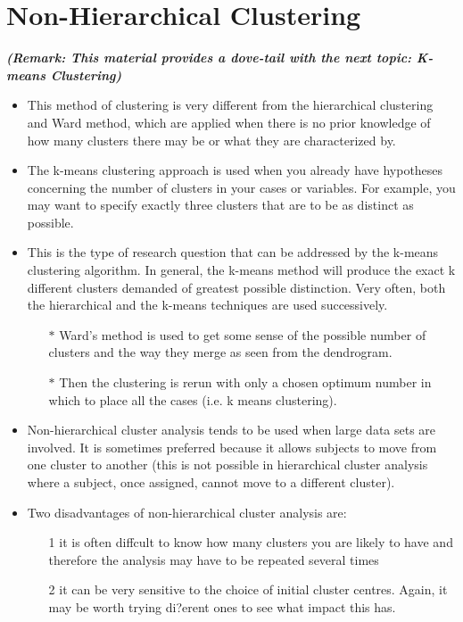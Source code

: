 \section{Non-Hierarchical Clustering}
\noindent \textbf{\textit{(Remark: This material provides a dove-tail with the next topic: K-means Clustering)}}\\ \smallskip
\begin{itemize}
\item This method of clustering is very different from the hierarchical clustering and Ward method, which are applied when there is no prior knowledge of how many clusters there may be or what they are characterized by.
\item  The k-means clustering approach is used when you already have hypotheses concerning the number of clusters in your cases or variables. For example, you may want to specify exactly three clusters that are to be as distinct as possible.
\item 
This is the type of research question that can be addressed by the k-means clustering algorithm. In general, the k-means method will produce the exact k different clusters demanded of greatest possible distinction. Very often, both the hierarchical and the k-means techniques are used successively.
\begin{itemize}
	\item[$\ast$] Ward's method is used to get some sense of the possible number of clusters and the way they merge as seen from the dendrogram.
\item[$\ast$] Then the clustering is rerun with only a chosen optimum number in which to place all
	the cases (i.e. k means clustering).
\end{itemize}
\item Non-hierarchical cluster analysis tends to be used when large data sets are involved. It is
sometimes preferred because it allows subjects to move from one cluster to another (this is
not possible in hierarchical cluster analysis where a subject, once assigned, cannot move to a
different cluster). 
\item Two disadvantages of non-hierarchical cluster analysis are: 
\begin{itemize}
	\item[1]it is often
	diffcult to know how many clusters you are likely to have and therefore the analysis may have
	to be repeated several times 
	\item[2] it can be very sensitive to the choice of initial cluster centres. Again, it may be worth trying di?erent ones to see what impact this has.
\end{itemize}
\end{itemize}
